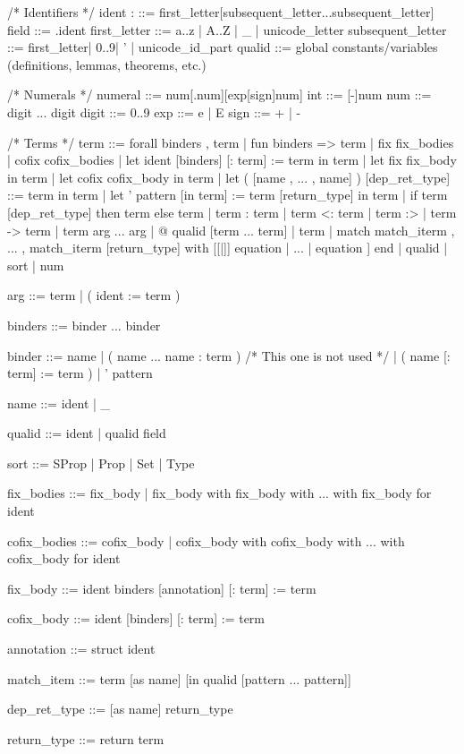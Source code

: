 \documentclass[a4paper,11pt]{article}
\begin{document}
\begin{grm}
/* Identifiers */
ident :			  ::= first_letter[subsequent_letter...subsequent_letter]
field             ::=  .ident
first_letter      ::=  a..z | A..Z | _ | unicode_letter 
subsequent_letter ::=  first_letter| 0..9| ' | unicode_id_part
qualid  ::=  global constants/variables (definitions, lemmas, theorems, etc.)

/* Numerals */
numeral ::=  num[.num][exp[sign]num]
int     ::=  [-]num
num     ::=  digit ... digit
digit   ::=  0..9
exp     ::=  e | E
sign    ::=  + | -

/* Terms */
term  ::=  forall binders , term
		 | fun binders => term
		 | fix fix_bodies
		 | cofix cofix_bodies
		 | let ident [binders] [: term] := term in term
		 | let fix fix_body in term
		 | let cofix cofix_body in term
		 | let ( [name , ... , name] ) [dep_ret_type] ::= term in term
		 | let ' pattern [in term] := term [return_type] in term
		 | if term [dep_ret_type] then term else term
		 | term : term
		 | term <: term
		 | term :>
		 | term -> term
		 | term arg ... arg   
		 | @ qualid [term ... term]
		 | term %
		 | match match_iterm , ... , match_iterm [return_type] with
		 	[[|]] equation | ... | equation ] end    
		 | qualid
		 | sort
		 | num

arg  ::=  term
		| ( ident := term )

binders ::=  binder ... binder

binder  ::=  name
		   | ( name ... name : term ) /* This one is not used */
		   | ( name [: term] := term )
		   | ' pattern

name  ::=  ident | _

qualid ::=  ident | qualid field

sort  ::=  SProp | Prop | Set | Type

fix_bodies  ::=  fix_body
			   | fix_body with fix_body with ... with fix_body for ident

cofix_bodies  ::=  cofix_body
				 | cofix_body with cofix_body with ... with cofix_body for ident

fix_body  ::=  ident binders [annotation] [: term] := term

cofix_body  ::=  ident [binders] [: term] := term

annotation  ::=  { struct ident }

match_item  ::=  term [as name] [in qualid [pattern ... pattern]]

dep_ret_type  ::=  [as name] return_type

return_type  ::=  return term


\end{grm}
\end{document}
